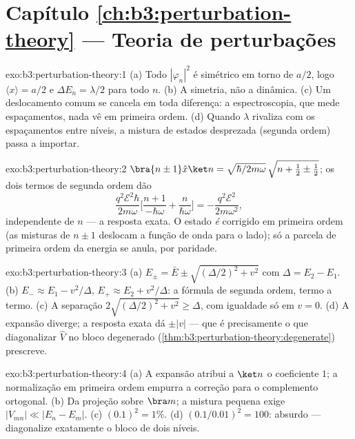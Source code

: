 \section*{Capítulo \ref{ch:b3:perturbation-theory} --- Teoria de perturbações}

\begin{solution}{exo:b3:perturbation-theory:1}
(a) Todo $|\varphi_n|^2$ é simétrico em torno de $a/2$, logo $\langle
x\rangle = a/2$ e $\Delta E_n = \lambda/2$ para todo $n$. (b) A
simetria, não a dinâmica. (c) Um deslocamento comum se cancela em toda
diferença: a espectroscopia, que mede espaçamentos, nada vê em primeira
ordem. (d) Quando $\lambda$ rivaliza com os espaçamentos entre níveis,
a mistura de estados desprezada (segunda ordem) passa a importar.
\end{solution}

\begin{solution}{exo:b3:perturbation-theory:2}
$\bra{n\pm1}\hat x\ket n = \sqrt{\hbar/2m\omega}\,\sqrt{n + \tfrac12
\pm \tfrac12}$; os dois termos de segunda ordem dão
\[
\frac{q^2\mathcal E^2\hbar}{2m\omega}\Big[\frac{n+1}{-\hbar\omega}
+ \frac{n}{\hbar\omega}\Big] = -\frac{q^2\mathcal E^2}{2m\omega^2} ,
\]
independente de $n$ --- a resposta exata. O estado \emph{é} corrigido
em primeira ordem (as misturas de $n \pm 1$ deslocam a função de onda
para o lado); só a parcela de primeira ordem da energia se anula, por
paridade.
\end{solution}

\begin{solution}{exo:b3:perturbation-theory:3}
(a) $E_\pm = \bar E \pm \sqrt{(\Delta/2)^2 + v^2}$ com $\Delta =
E_2 - E_1$. (b) $E_- \approx E_1 - v^2/\Delta$, $E_+ \approx E_2 +
v^2/\Delta$: a fórmula de segunda ordem, termo a termo. (c) A separação
$2\sqrt{(\Delta/2)^2 + v^2} \ge \Delta$, com igualdade só em $v =
0$. (d) A expansão diverge; a resposta exata dá $\pm|v|$ --- que é
precisamente o que diagonalizar $\hat V$ no bloco degenerado
(\cref{thm:b3:perturbation-theory:degenerate}) prescreve.
\end{solution}

\begin{solution}{exo:b3:perturbation-theory:4}
(a) A expansão atribui a $\ket n$ o coeficiente $1$; a normalização em
primeira ordem empurra a correção para o complemento ortogonal. (b) Da
projeção sobre $\bra m$; a mistura pequena exige
$|V_{mn}| \ll |E_n - E_m|$. (c) $(0.1)^2 = 1\%$. (d)
$(0.1/0.01)^2 = 100$: absurdo --- diagonalize exatamente o bloco de
dois níveis.
\end{solution}

